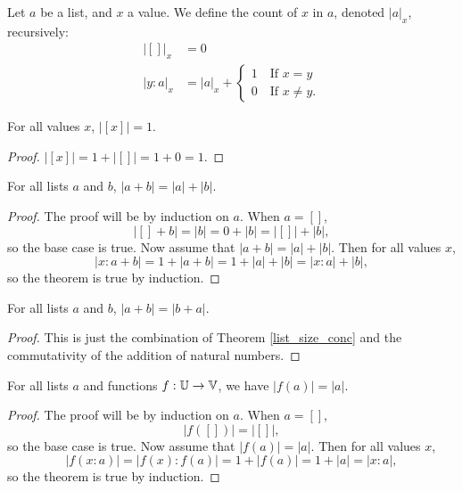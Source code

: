 \documentclass[../math.tex]{subfiles}
\begin{document}
\begin{definition}
    Let $a$ be a list, and $x$ a value.  We define the count of $x$ in $a$,
    denoted $|a|_x$, recursively:
    \begin{align*}
           |[]|_x &= 0 \\
        |y : a|_x &= |a|_x + \begin{cases}
            1 \quad \text{If $x = y$} \\
            0 \quad \text{If $x \neq y$}.
        \end{cases}
    \end{align*}
\end{definition}

\begin{theorem}
    For all values $x$, $|[x]| = 1$.
\end{theorem}
\begin{proof}
    $|[x]| = 1 + |[]| = 1 + 0 = 1$.
\end{proof}

\begin{theorem} \label{list_size_conc}
    For all lists $a$ and $b$, $|a + b| = |a| + |b|$.
\end{theorem}
\begin{proof}
    The proof will be by induction on $a$.  When $a = []$,
    \[
        |[] + b| = |b| = 0 + |b| = |[]| + |b|,
    \]
    so the base case is true.  Now assume that $|a + b| = |a| + |b|$.  Then for
    all values $x$,
    \[
        |x : a + b| = 1 + |a + b| = 1 + |a| + |b| = |x : a| + |b|,
    \]
    so the theorem is true by induction.
\end{proof}

\begin{theorem} \label{list_size_comm}
    For all lists $a$ and $b$, $|a + b| = |b + a|$.
\end{theorem}
\begin{proof}
    This is just the combination of Theorem \ref{list_size_conc} and the
    commutativity of the addition of natural numbers.
\end{proof}

\begin{theorem} \label{list_image_size}
    For all lists $a$ and functions $f : \mathbb{U} \to \mathbb{V}$, we have $|f(a)| = |a|$.
\end{theorem}
\begin{proof}
    The proof will be by induction on $a$.  When $a = []$,
    \[
        |f([])| = |[]|,
    \]
    so the base case is true.  Now assume that $|f(a)| = |a|$.  Then for all
    values $x$,
    \[
        |f(x : a)| = |f(x) : f(a)| = 1 + |f(a)| = 1 + |a| = |x : a|,
    \]
    so the theorem is true by induction.
\end{proof}
\end{document}
